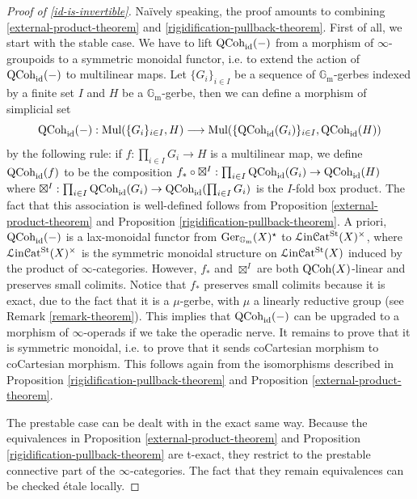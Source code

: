 \documentclass[11pt, twoside]{article} %
\numberwithin{equation}{section}
\theoremstyle{plain}
\theoremstyle{definition}
\newcommand{\Gm}{\mathbb G_{\mathrm{m}}}
\newcommand{\id}{\textup{id}}
\newcommand{\QCoh}{\textup{QCoh}}
\newcommand{\Ger}{\textup{Ger}}
\newcommand{\Lin}{\mathcal L\textup{in}\mathcal{C}\textup{at}^{\textup{St}}}
\begin{document}
 
	\begin{proof}[Proof of \cref{id-is-invertible}]
	Na\"ively speaking, the proof amounts to combining \cref{external-product-theorem} and \cref{rigidification-pullback-theorem}. First of all, we start with the stable case. We have to lift $\QCoh_{\id}(-)$ from a morphism of $\infty$-groupoids to a symmetric monoidal functor, i.e. to extend the action of $\QCoh_{\id}(-)$ to multilinear maps. Let $\{ G_i \}_{i \in I}$ be a sequence of $\Gm$-gerbes indexed by a finite set $I$ and $H$ be a $\Gm$-gerbe, then we can define a morphism of simplicial set
	$$\QCoh_{\id}(-): \textup{Mul}(\{ G_i \}_{i \in I}, H) \longrightarrow \textup{Mul}(\{ \QCoh_{\id}(G_i) \}_{i \in I}, \QCoh_{\id}(H))$$ 
	by the following rule: if $f:\prod_{i \in I} G_i \rightarrow H$ is a multilinear map, we define $\QCoh_{\id}(f)$ to be the composition $f_* \circ \boxtimes^I: \prod_{i \in I} \QCoh_{\id}(G_i) \rightarrow \QCoh_{\id}(H)$ where $\boxtimes^I:\prod_{i \in I} \QCoh_{\id}(G_i) \rightarrow \QCoh_{\id}(\prod_{i \in I}G_i)$ is the $I$-fold box product. The fact that this association is well-defined follows from Proposition \ref{external-product-theorem} and Proposition \ref{rigidification-pullback-theorem}. A priori, $\QCoh_{\id}(-)$ is a lax-monoidal functor from $\Ger_{\Gm}(X)^{\star}$ to $\Lin(X)^{\times}$, where $\Lin(X)^{\times}$ is the symmetric monoidal structure on $\Lin(X)$ induced by the product of $\infty$-categories. However, $f_*$ and $\boxtimes^I$ are both $\QCoh(X)$-linear and preserves small colimits. Notice that $f_*$ preserves small colimits because it is exact, due to the fact that it is a $\mu$-gerbe, with $\mu$ a linearly reductive group (see Remark \ref{remark-theorem}). This implies that $\QCoh_{\id}(-)$ can be upgraded to a morphism of $\infty$-operads if we take the operadic nerve. It remains to prove that it is symmetric monoidal, i.e. to prove that it sends coCartesian morphism to coCartesian morphism. This follows again from the isomorphisms described in Proposition \ref{rigidification-pullback-theorem} and Proposition \ref{external-product-theorem}.
	
	
	
	
	The prestable case can be dealt with in the exact same way. Because the equivalences in Proposition \ref{external-product-theorem} and Proposition \ref{rigidification-pullback-theorem} are t-exact, they restrict to the prestable connective part of the $\infty$-categories. The fact that they remain equivalences can be checked \'etale locally.
	\end{proof}
\end{document}
